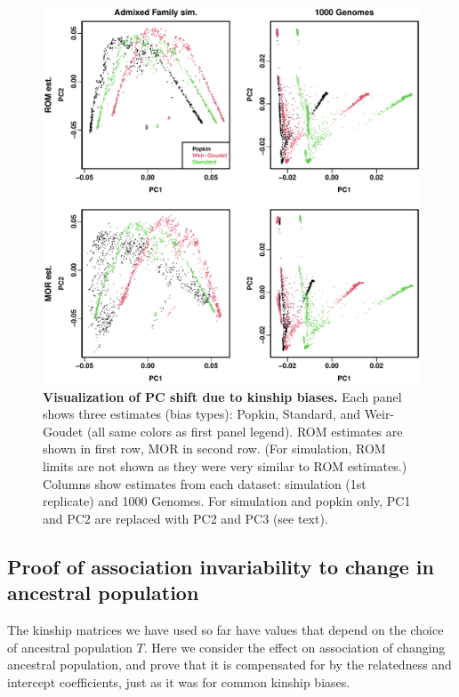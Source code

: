 \documentclass[11pt]{article}
\begin{document}
\begin{figure}[bp!]
  \centering
  \includegraphics[width=\textwidth]{pcs.pdf}
  \caption{
    {\bf Visualization of PC shift due to kinship biases.}
    Each panel shows three estimates (bias types): Popkin, Standard, and Weir-Goudet (all same colors as first panel legend).
    ROM estimates are shown in first row, MOR in second row.
    (For simulation, ROM limits are not shown as they were very similar to ROM estimates.)
    Columns show estimates from each dataset: simulation (1st replicate) and 1000 Genomes.
    For simulation and popkin only, PC1 and PC2 are replaced with PC2 and PC3 (see text).
  }
  \label{fig:pcs}
\end{figure}

\subsection{Proof of association invariability to change in ancestral population}

The kinship matrices we have used so far have values that depend on the choice of ancestral population $T$.
Here we consider the effect on association of changing ancestral population, and prove that it is compensated for by the relatedness and intercept coefficients, just as it was for common kinship biases.
\end{document}
